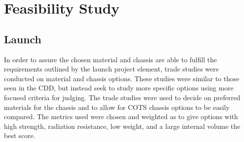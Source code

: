 
\section{Feasibility Study}

\subsection{Launch}
In order to assure the chosen material and chassis are able to fulfill the requirements outlined by the launch project element, trade studies were conducted on material and chassis options. These studies were similar to those seen in the CDD, but instead seek to study more specific options using more focused criteria for judging. The trade studies were used to decide on preferred materials for the chassis and to allow for COTS chassis options to be easily compared. The metrics used were chosen and weighted as to give options with high strength, radiation resistance, low weight, and a large internal volume the best score.
